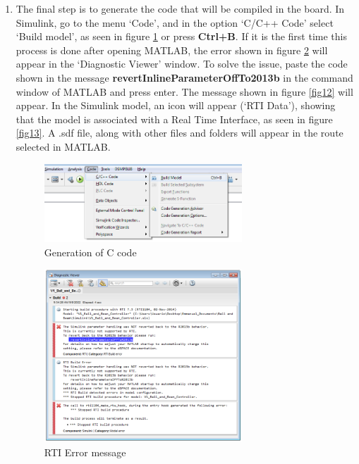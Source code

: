 \begin{enumerate}
    \item The final step is to generate the code that will be compiled in the board. In Simulink, go to the menu ‘Code’, and in the option ‘C/C++ Code’ select ‘Build model’, as seen in figure \ref{fig10} or press \textbf{Ctrl+B}. If it is the first time this process is done after opening MATLAB, the error shown in figure \ref{fig11} will appear in the ‘Diagnostic Viewer’ window. To solve the issue, paste the code shown in the message \textbf{revertInlineParameterOffTo2013b} in the command window of MATLAB and press enter. The message shown in figure \ref{fig12} will appear. In the Simulink model, an icon will appear (‘RTI Data’), showing that the model is associated with a Real Time Interface, as seen in figure \ref{fig13}. A .sdf file, along with other files and folders will appear in the route selected in MATLAB.
    \begin{figure}[H]
        \centering
        \includegraphics[width=0.7\textwidth]{Images/Ball and Bean/MatLab9.png}
        \caption{Generation of C code}
        \label{fig10}
    \end{figure}
    
    \begin{figure}[H]
        \centering
        \includegraphics[width=0.7\textwidth]{Images/Ball and Bean/MatLab10.png}
        \caption{RTI Error message}
        \label{fig11}
    \end{figure}
    

\end{enumerate}
